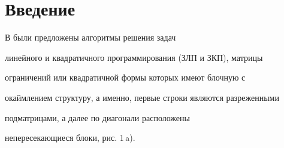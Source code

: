 

\maketitle


\label{begin}








\section{Введение}





В \cite{Prepr} были предложены алгоритмы решения задач


линейного и квадратичного программирования (ЗЛП и ЗКП), матрицы


ограничений или квадратичной формы которых имеют блочную с


окаймлением структуру, а именно, первые строки являются разреженными


\cite{Pissan} подматрицами, а далее по диагонали расположены


непересекающиеся блоки, рис. 1\,a).





